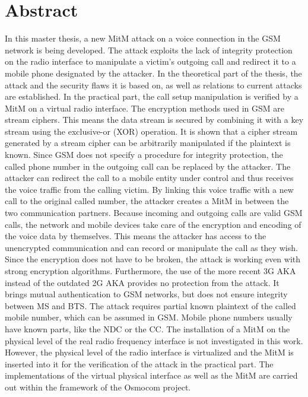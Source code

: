 \section*{Abstract}	%
\begin{spacing}{1.2}

In this master thesis, a new \ac{MitM} attack on a voice connection in the \ac{GSM} network is being developed. The attack exploits the lack of integrity protection on the radio interface to manipulate a victim's outgoing call and redirect it to a mobile phone designated by the attacker. In the theoretical part of the thesis, the attack and the security flaws it is based on, as well as relations to current attacks are established. In the practical part, the call setup manipulation is verified by a \ac{MitM} on a virtual radio interface. The encryption methods used in \ac{GSM} are stream ciphers. This means the data stream is secured by combining it with a key stream using the exclusive-or (\acs{XOR}) operation. It is shown that a cipher stream generated by a stream cipher can be arbitrarily manipulated if the plaintext is known. Since \ac{GSM} does not specify a procedure for integrity protection, the called phone number in the outgoing call can be replaced by the attacker. The attacker can redirect the call to a mobile entity under control and thus receives the voice traffic from the calling victim. By linking this voice traffic with a new call to the original called number, the attacker creates a \ac{MitM} in between the two communication partners. Because incoming and outgoing calls are valid \ac{GSM} calls, the network and mobile devices take care of the encryption and encoding of the voice data by themselves. This means the attacker has access to the unencrypted communication and can record or manipulate the call as they wish. Since the encryption does not have to be broken, the attack is working even with strong encryption algorithms. Furthermore, the use of the more recent 3G \ac{AKA} instead of the outdated 2G \ac{AKA} provides no protection from the attack. It brings mutual authentication to \ac{GSM} networks, but does not ensure integrity between \ac{MS} and \ac{BTS}. The attack requires partial known plaintext of the called mobile number, which can be assumed in \ac{GSM}. Mobile phone numbers usually have known parts, like the \ac{NDC} or the \ac{CC}. The installation of a \ac{MitM} on the physical level of the real radio frequency interface is not investigated in this work. However, the physical level of the radio interface is virtualized and the \ac{MitM} is inserted into it for the verification of the attack in the practical part. The implementations of the virtual physical interface as well as the \ac{MitM} are carried out within the framework of the Osmocom project.
\end{spacing}
\vfill
\acresetall